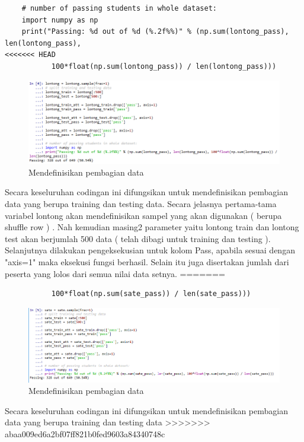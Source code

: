 \begin{enumerate}
\begin{verbatim}
	# number of passing students in whole dataset:
	import numpy as np
	print("Passing: %d out of %d (%.2f%%)" % (np.sum(lontong_pass), len(lontong_pass), 
<<<<<<< HEAD
	       100*float(np.sum(lontong_pass)) / len(lontong_pass)))
\end{verbatim}
\begin{figure}[ht]
\centering
\includegraphics[scale=0.6]{figures/lontong/4.png}
\caption{Mendefinisikan pembagian data}
\end{figure}
\par
	Secara keseluruhan codingan ini difungsikan untuk mendefinisikan pembagian data yang berupa training dan testing data. Secara jelasnya pertama-tama variabel lontong akan mendefinisikan sampel yang akan digunakan ( berupa shuffle row ) . Nah kemudian masing2 parameter yaitu lontong train dan lontong test akan berjumlah 500 data ( telah dibagi untuk training dan testing ). Selanjutnya dilakukan pengeksekusian untuk kolom Pass, apabila sesuai dengan "axis=1" maka eksekusi fungsi berhasil. Selain itu juga disertakan jumlah dari peserta yang lolos dari semua nilai data setnya.
=======
\begin{verbatim}
	       100*float(np.sum(sate_pass)) / len(sate_pass)))
\end{verbatim}
\begin{figure}[ht]
\centering
\includegraphics[scale=0.6]{figures/43.png}
\caption{Mendefinisikan pembagian data}
\end{figure}
\par
	Secara keseluruhan codingan ini difungsikan untuk mendefinisikan pembagian data yang berupa training dan testing data
>>>>>>> abaa009ed6a2bf07ff821b0fed9603a84340748c


\end{enumerate}
